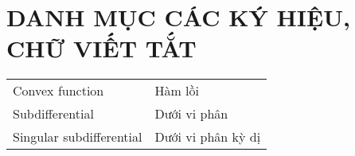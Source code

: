 \chapter*{DANH MỤC CÁC KÝ HIỆU, CHỮ VIẾT TẮT}
\begin{center}
	\begin{longtable}{ l  l }
		  Convex function & Hàm lồi \\
            Subdifferential & Dưới vi phân \\
            Singular subdifferential & Dưới vi phân kỳ dị \\
\end{longtable}

\end{center}